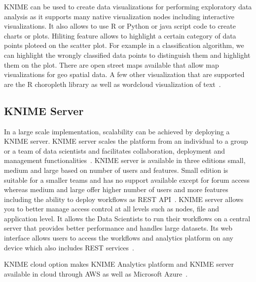 KNIME can be used to create data visualizations for performing exploratory data
analysis as it supports many native visualization nodes including interactive
visualizations.  It also allows to use R or Python or java script code to create
charts or plots. Hiliting feature allows to highlight a certain category of data
points ploteed on the scatter plot. For example in a classification algorithm, we
can highlight the wrongly classified data points to distinguish them and
highlight them on the plot. There are open street maps available that allow map
visualizations for geo spatial data. A few other visualization that are
supported are the R choropleth library as well as wordcloud visualization of
text~\cite{hid-sp18-517-visual}.

\subsection{KNIME Server}
In a large scale implementation, scalability can be achieved by deploying a
KNIME server. KNIME server scales the platform from an individual to a group or
a team of data scientists and facilitates collaboration, deployment and
management functionalities~\cite{hid-sp18-517-server}. KNIME server is available
in three editions small, medium and large based on number of users and
features. Small edition is suitable for a smaller teams and has no support
available except for forum access whereas medium and large offer higher number
of users and more features including the ability to deploy workflows as REST
API~\cite{hid-sp18-517-editions}.  KNIME server allows you to better manage
access control at all levels such as nodes, file and application level. It
allows the Data Scientists to run their workflows on a central server that
provides better performance and handles large datasets. Its web interface allows
users to access the workflows and analytics platform on any device which also
includes REST services~\cite{hid-sp18-517-editions}.

KNIME cloud option makes KNIME Analytics platform and KNIME server available in
cloud through AWS as well as Microsoft Azure~\cite{hid-sp18-517-cloud}.

